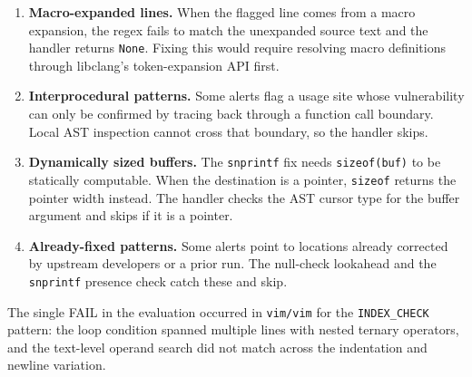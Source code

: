 \begin{enumerate}
  \item \textbf{Macro-expanded lines.} When the flagged line comes from a macro expansion, the regex fails to match the unexpanded source text and the handler returns \texttt{None}. Fixing this would require resolving macro definitions through libclang's token-expansion API first.

  \item \textbf{Interprocedural patterns.} Some alerts flag a usage site whose vulnerability can only be confirmed by tracing back through a function call boundary. Local AST inspection cannot cross that boundary, so the handler skips.

  \item \textbf{Dynamically sized buffers.} The \texttt{snprintf} fix needs \texttt{sizeof(buf)} to be statically computable. When the destination is a pointer, \texttt{sizeof} returns the pointer width instead. The handler checks the AST cursor type for the buffer argument and skips if it is a pointer.

  \item \textbf{Already-fixed patterns.} Some alerts point to locations already corrected by upstream developers or a prior run. The null-check lookahead and the \texttt{snprintf} presence check catch these and skip.
\end{enumerate}

The single FAIL in the evaluation occurred in \texttt{vim/vim} for the \texttt{INDEX\_CHECK} pattern: the loop condition spanned multiple lines with nested ternary operators, and the text-level operand search did not match across the indentation and newline variation.
